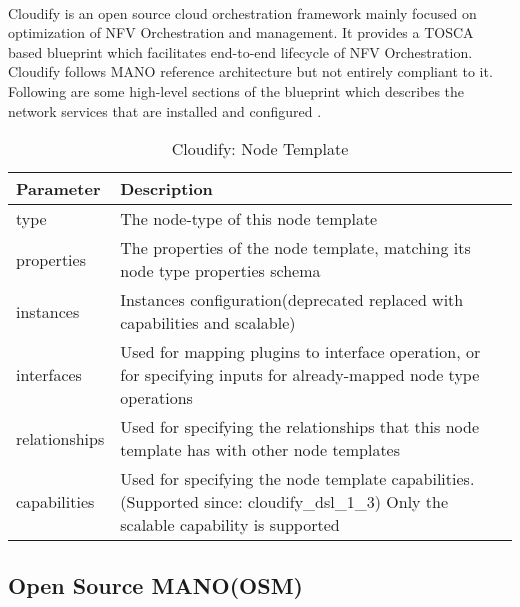 \paragraph{}
Cloudify is an open source cloud orchestration framework mainly focused on optimization of NFV Orchestration and management. It provides a TOSCA based blueprint which facilitates end-to-end lifecycle of NFV Orchestration. Cloudify follows MANO reference architecture but not entirely compliant to it\cite{de2018network}. Following are some high-level sections of the blueprint which describes the network services that are installed and configured \cite{CloudifySchemaDocumentation}.
    \begin{table}[h]
        \centering
    \begin{tabular}{ |p{4cm}|p{10cm}|}
        \hline
        \textbf{Parameter} & \textbf{Description} \\
        \hline
         
         type & The node-type of this node template \\
         \hline
         properties &   The properties of the node template, matching its node type properties schema \\
         \hline
         instances &    Instances configuration(deprecated replaced with capabilities and scalable) \\
         \hline
         interfaces  & Used for mapping plugins to interface operation, or for specifying inputs for already-mapped node type operations \\
         \hline
         relationships &    Used for specifying the relationships that this node template has with other node templates \\
         \hline
         capabilities & Used for specifying the node template capabilities. (Supported since: cloudify\_dsl\_1\_3) Only the scalable capability is supported\\
         \hline
    \end{tabular}
    \caption{Cloudify: Node Template}
    \label{tab:Cloudify_node_template}
 \end{table}
\subsection{Open Source MANO(OSM)}
